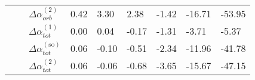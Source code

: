 \begin{longtable}{lllllllll}
      &       & $\Delta \alpha_{orb}^{(\text{2})}$ &          0.42 &           3.30 &        2.38 &       -1.42 &      -16.71 &      -53.95 \\
      &       & $\Delta \alpha_{tot}^{(\text{1})}$ &          0.00 &           0.04 &       -0.17 &       -1.31 &       -3.71 &       -5.37 \\
      &       & $\Delta \alpha_{tot}^{(\text{so})}$ &          0.06 &          -0.10 &       -0.51 &       -2.34 &      -11.96 &      -41.78 \\
      &       & $\Delta \alpha_{tot}^{(\text{2})}$ &          0.06 &          -0.06 &       -0.68 &       -3.65 &      -15.67 &      -47.15 \\
\end{longtable}

